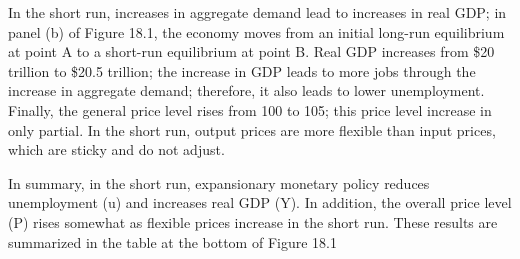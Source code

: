 \documentclass[11pt]{article} %
\begin{document}
In the short run, increases in aggregate demand lead to increases in real GDP; in panel (b) of Figure 18.1, the economy moves from an initial long-run equilibrium at point A to a short-run equilibrium at point B. Real GDP increases from \$20 trillion to \$20.5 trillion; the increase in GDP leads to more jobs through the increase in aggregate demand; therefore, it also leads to lower unemployment. Finally, the general price level rises from 100 to 105; this price level increase in only partial. In the short run, output prices are more flexible than input prices, which are sticky and do not adjust.

In summary, in the short run, expansionary monetary policy reduces unemployment (u) and increases real GDP (Y). In addition, the overall price level (P) rises somewhat as flexible prices increase in the short run. These results are summarized in the table at the bottom of Figure 18.1
\end{document}
